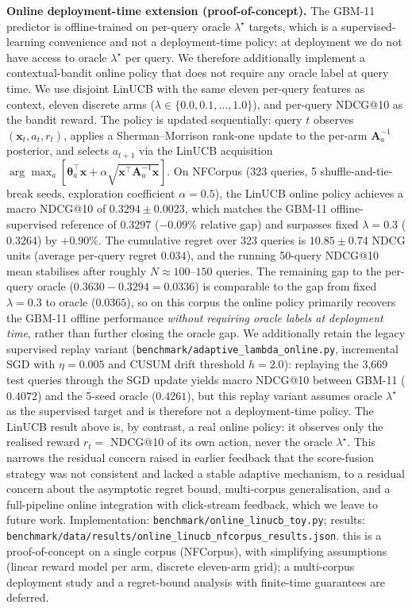 \documentclass[review,1p]{elsarticle}
\begin{document}
\textbf{Online deployment-time extension (proof-of-concept).} The GBM-11 predictor is offline-trained on per-query oracle $\lambda^\star$ targets, which is a supervised-learning convenience and not a deployment-time policy: at deployment we do not have access to oracle $\lambda^\star$ per query. We therefore additionally implement a contextual-bandit online policy that does not require any oracle label at query time. We use disjoint LinUCB \citep{Li2010ContextualBandits} with the same eleven per-query features as context, eleven discrete arms ($\lambda \in \{0.0, 0.1, \ldots, 1.0\}$), and per-query NDCG@10 as the bandit reward. The policy is updated sequentially: query $t$ observes $(\mathbf{x}_t, a_t, r_t)$, applies a Sherman--Morrison rank-one update to the per-arm $\mathbf{A}_a^{-1}$ posterior, and selects $a_{t+1}$ via the LinUCB acquisition $\arg\max_a [\boldsymbol{\theta}_a^\top \mathbf{x} + \alpha \sqrt{\mathbf{x}^\top \mathbf{A}_a^{-1} \mathbf{x}}]$. On NFCorpus (323 queries, 5 shuffle-and-tie-break seeds, exploration coefficient $\alpha=0.5$), the LinUCB online policy achieves a macro NDCG@10 of $0.3294 \pm 0.0023$, which matches the GBM-11 offline-supervised reference of $0.3297$ ($-0.09\%$ relative gap) and surpasses fixed $\lambda=0.3$ ($0.3264$) by $+0.90\%$. The cumulative regret over 323 queries is $10.85 \pm 0.74$ NDCG units (average per-query regret $0.034$), and the running 50-query NDCG@10 mean stabilises after roughly $N \approx 100$--$150$ queries. The remaining gap to the per-query oracle ($0.3630 - 0.3294 = 0.0336$) is comparable to the gap from fixed $\lambda=0.3$ to oracle ($0.0365$), so on this corpus the online policy primarily recovers the GBM-11 offline performance \emph{without requiring oracle labels at deployment time}, rather than further closing the oracle gap. We additionally retain the legacy supervised replay variant (\texttt{benchmark/adaptive\_lambda\_online.py}, incremental SGD with $\eta=0.005$ and CUSUM drift threshold $h=2.0$): replaying the 3{,}669 test queries through the SGD update yields macro NDCG@10 between GBM-11 ($0.4072$) and the 5-seed oracle ($0.4261$), but this replay variant assumes oracle $\lambda^\star$ as the supervised target and is therefore not a deployment-time policy. The LinUCB result above is, by contrast, a real online policy: it observes only the realised reward $r_t = $ NDCG@10 of its own action, never the oracle $\lambda^\star$. This narrows the residual concern raised in earlier feedback that the score-fusion strategy was not consistent and lacked a stable adaptive mechanism, to a residual concern about the asymptotic regret bound, multi-corpus generalisation, and a full-pipeline online integration with click-stream feedback, which we leave to future work. Implementation: \texttt{benchmark/online\_linucb\_toy.py}; results: \texttt{benchmark/data/results/online\_linucb\_nfcorpus\_results.json}. this is a proof-of-concept on a single corpus (NFCorpus), with simplifying assumptions (linear reward model per arm, discrete eleven-arm grid); a multi-corpus deployment study and a regret-bound analysis with finite-time guarantees are deferred.
\end{document}
